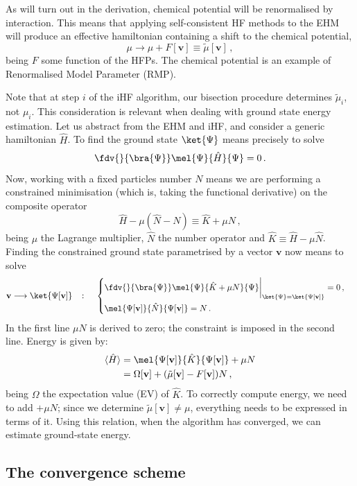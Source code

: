 As will turn out in the derivation, chemical potential will be renormalised by interaction. This means that applying self-consistent HF methods to the EHM will produce an effective hamiltonian containing a shift to the chemical potential,
\[
	\mu \to \mu + F[\mathbf{v}] \equiv \tilde{\mu} [\mathbf{v}] \, ,
\]
being $F$ some function of the HFPs. The chemical potential is an example of Renormalised Model Parameter (RMP).

Note that at step $i$ of the iHF algorithm, our bisection procedure determines $\tilde{\mu}_i$, not $\mu_i$. This consideration is relevant when dealing with ground state energy estimation. Let us abstract from the EHM and iHF, and consider a generic hamiltonian $\hat H$. To find the ground state $\ket{\Psi}$ means precisely to solve
\[
	\fdv{}{\bra{\Psi}} \mel{\Psi}{\hat H}{\Psi} = 0 \, .
\]
Now, working with a fixed particles number $N$ means we are performing a constrained minimisation (which is, taking the functional derivative) on the composite operator
\[
	\hat H - \mu (\hat N - N) \equiv \hat K + \mu N \, ,
\]
being $\mu$ the Lagrange multiplier, $\hat N$ the number operator and $\hat K \equiv \hat H - \mu \hat N$. Finding the constrained ground state parametrised by a vector $\mathbf{v}$ now means to solve
\[
	\mathbf{v} \longrightarrow \ket{\Psi [\mathbf{v}]}
	\quad\colon\quad
	\begin{cases}
		\displaystyle
		\fdv{}{\bra{\Psi}} \mel{\Psi}{\hat K + \mu N}{\Psi} \bigg|_{\ket{\Psi}=\ket{\Psi [\mathbf{v}]}} = 0 \, , \\[1em]
		\mel{\Psi [\mathbf{v}]}{\hat N}{\Psi [\mathbf{v}]} = N \, .
	\end{cases}
\]
In the first line $\mu N$ is derived to zero; the constraint is imposed in the second line. Energy is given by:
\[
\begin{aligned}
	\langle \hat H \rangle &= \mel{\Psi[\mathbf{v}]}{\hat K}{\Psi[\mathbf{v}]} + \mu N \\
	&= \Omega[\mathbf{v}] + (\tilde{\mu}[\mathbf{v}]-F[\mathbf{v}]) N \, ,
\end{aligned}
\]
being $\Omega$ the expectation value (EV) of $\hat K$. To correctly compute energy, we need to add $+\mu N$; since we determine $\tilde{\mu}[\mathbf{v}] \neq \mu$, everything needs to be expressed in terms of it. Using this relation, when the algorithm has converged, we can estimate ground-state energy.

\subsection{The convergence scheme}\label{subsec:reject-mix-iterate}

